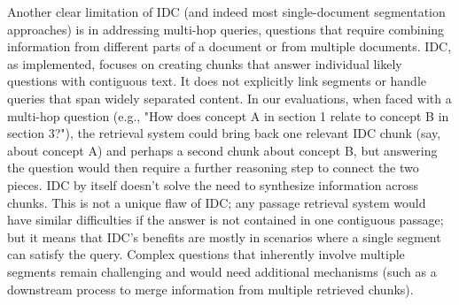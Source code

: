 \documentclass[12pt,a4paper]{report}
\begin{document}
Another clear limitation of IDC (and indeed most single-document segmentation approaches) is in addressing multi-hop queries, questions that require combining information from different parts of a document or from multiple documents. IDC, as implemented, focuses on creating chunks that answer individual likely questions with contiguous text. It does not explicitly link segments or handle queries that span widely separated content. In our evaluations, when faced with a multi-hop question (e.g., "How does concept A in section 1 relate to concept B in section 3?"), the retrieval system could bring back one relevant IDC chunk (say, about concept A) and perhaps a second chunk about concept B, but answering the question would then require a further reasoning step to connect the two pieces. IDC by itself doesn't solve the need to synthesize information across chunks. This is not a unique flaw of IDC; any passage retrieval system would have similar difficulties if the answer is not contained in one contiguous passage; but it means that IDC's benefits are mostly in scenarios where a single segment can satisfy the query. Complex questions that inherently involve multiple segments remain challenging and would need additional mechanisms (such as a downstream process to merge information from multiple retrieved chunks).
\end{document}
